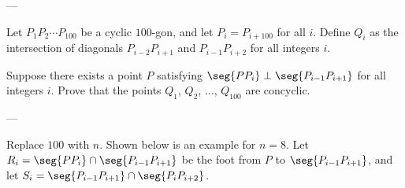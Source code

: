 
---

Let $P_1P_2\cdots P_{100}$ be a cyclic $100$-gon, and let $P_i=P_{i+100}$ for all $i$. Define $Q_i$ as the intersection of diagonals $P_{i-2}P_{i+1}$ and $P_{i-1}P_{i+2}$ for all integers $i$.

Suppose there exists a point $P$ satisfying $\seg{PP_i}\perp\seg{P_{i-1}P_{i+1}}$ for all integers $i$. Prove that the points $Q_1$, $Q_2$, $\ldots$, $Q_{100}$ are concyclic.

---

Replace $100$ with $n$. Shown below is an example for $n=8$. Let $R_i=\seg{PP_i}\cap\seg{P_{i-1}P_{i+1}}$ be the foot from $P$ to $\seg{P_{i-1}P_{i+1}}$, and let $S_i=\seg{P_{i-1}P_{i+1}}\cap\seg{P_iP_{i+2}}$.
